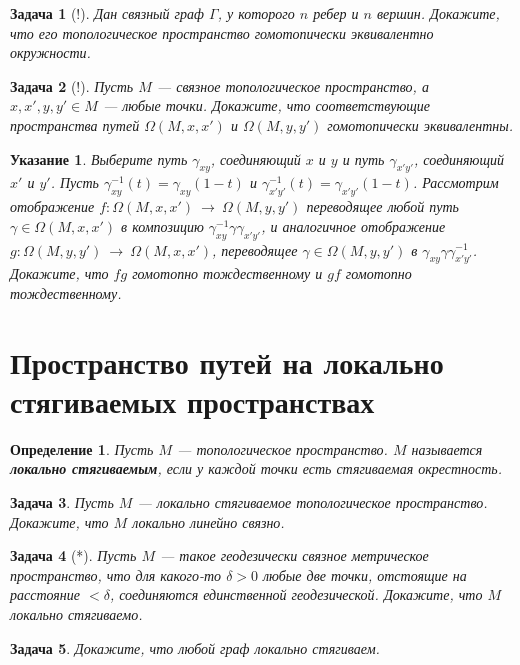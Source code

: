 \documentclass[12pt]{book}
\newcommand{\subs}{\section}
\newcommand{\arrow}{{\:\longrightarrow\:}}
\theoremstyle{upshape}
\newtheorem{zadacha}{Задача}[chapter]
\theoremstyle{generic}
\newtheorem{opredelenie}[teorema]{Определение}
\theoremstyle{upshapenonumber}
\newtheorem{ukazanie}{Указание}[section]
\newcommand{\следствие}{%
     \refstepcounter{teorema}
     {\noindent\bf Следствие \thechapter.\arabic{teorema}:\ }}
\newcommand{\пример}{%
     \refstepcounter{teorema}
     {\noindent\bf Пример \thechapter.\arabic{teorema}:\ }}
\newcommand{\лемма}{%
     \refstepcounter{teorema}
     {\noindent\bf Лемма \thechapter.\arabic{teorema}:\ }}
\newcommand{\теорема}{%
     \refstepcounter{teorema}
     {\noindent\bf Теорема \thechapter.\arabic{teorema}:\ }}
\newcommand{\утверждение}{%
     \refstepcounter{teorema}
     {\noindent\bf Утверждение \thechapter.\arabic{teorema}:\ }}
\begin{document}
{\begin{zadacha}[!]
Дан связный граф $\Gamma$, у которого
$n$ ребер и $n$ вершин. Докажите, что его топологическое
пространство гомотопически эквивалентно окружности.
\end{zadacha}

\begin{zadacha}[!]
Пусть $M$ --- связное топологическое
пространство, а $x,x', y, y'\in M$ --- любые точки. 
Докажите, что соответствующие пространства путей 
$\Omega(M,x,x')$ и $\Omega(M,y,y')$ гомотопически
эквивалентны.
\end{zadacha}

\begin{ukazanie} 
Выберите путь $\gamma_{xy}$, соединяющий
$x$ и $y$ и путь $\gamma_{x'y'}$, соединяющий
$x'$ и $y'$. Пусть $\gamma^{-1}_{xy}(t)=\gamma_{xy}(1-t)$ 
и $\gamma^{-1}_{x'y'}(t)=\gamma_{x'y'}(1-t)$. 
Рассмотрим отображение 
$f:\Omega(M,x,x')\arrow\Omega(M,y,y')$
переводящее любой путь $\gamma\in \Omega(M,x,x')$
в композицию $\gamma^{-1}_{xy}\gamma\gamma_{x'y'}$, и аналогичное
отображение 
$g:\Omega(M,y,y')\arrow\Omega(M,x,x')$,
переводящее $\gamma\in \Omega(M,y,y')$ в 
$\gamma_{xy}\gamma\gamma^{-1}_{x'y'}$.
Докажите, что $fg$ гомотопно тождественному
и $gf$ гомотопно тождественному.
\end{ukazanie}

\subs{Пространство путей на локально стягиваемых пространствах}

\begin{opredelenie}
Пусть $M$ --- топологическое пространство. $M$
называется {\bf локально стягиваемым}, если 
у каждой точки есть стягиваемая окрестность.
\end{opredelenie}

\begin{zadacha} Пусть
$M$ --- локально стягиваемое топологическое пространство.
Докажите, что $M$ локально линейно связно.
\end{zadacha}

\begin{zadacha}[*]
Пусть $M$ --- такое геодезически связное метрическое пространство,
что для какого-то $\delta>0$ любые две точки,
отстоящие на расстояние $<\delta$, соединяются
единственной геодезической. Докажите, что $M$
локально стягиваемо.
\end{zadacha}

\begin{zadacha}
Докажите, что любой граф локально стягиваем.
\end{zadacha}

}
\end{document}

